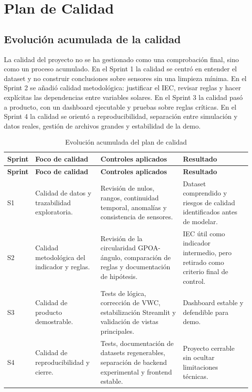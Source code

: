 \documentclass[11pt,a4paper]{article}
\begin{document}
\newpage

\section{Plan de Calidad}

\subsection{Evolución acumulada de la calidad}

La calidad del proyecto no se ha gestionado como una comprobación final, sino como un proceso acumulado. En el Sprint 1 la calidad se centró en entender el dataset y no construir conclusiones sobre sensores sin una limpieza mínima. En el Sprint 2 se añadió calidad metodológica: justificar el IEC, revisar reglas y hacer explícitas las dependencias entre variables solares. En el Sprint 3 la calidad pasó a producto, con un dashboard ejecutable y pruebas sobre reglas críticas. En el Sprint 4 la calidad se orientó a reproducibilidad, separación entre simulación y datos reales, gestión de archivos grandes y estabilidad de la demo.

\begin{longtable}{p{1.4cm}p{4.2cm}p{4.5cm}p{5cm}}
\caption{Evolución acumulada del plan de calidad}\\
\toprule
\textbf{Sprint} & \textbf{Foco de calidad} & \textbf{Controles aplicados} & \textbf{Resultado} \\
\midrule
\endfirsthead
\toprule
\textbf{Sprint} & \textbf{Foco de calidad} & \textbf{Controles aplicados} & \textbf{Resultado} \\
\midrule
\endhead
S1 & Calidad de datos y trazabilidad exploratoria. & Revisión de nulos, rangos, continuidad temporal, anomalías y consistencia de sensores. & Dataset comprendido y riesgos de calidad identificados antes de modelar. \\
S2 & Calidad metodológica del indicador y reglas. & Revisión de la circularidad GPOA-ángulo, comparación de reglas y documentación de hipótesis. & IEC útil como indicador intermedio, pero retirado como criterio final de control. \\
S3 & Calidad de producto demostrable. & Tests de lógica, corrección de VWC, estabilización Streamlit y validación de vistas principales. & Dashboard estable y defendible para demo. \\
S4 & Calidad de reproducibilidad y cierre. & Tests, documentación de datasets regenerables, separación de backend experimental y frontend estable. & Proyecto cerrable sin ocultar limitaciones técnicas. \\
\bottomrule
\end{longtable}
\end{document}
